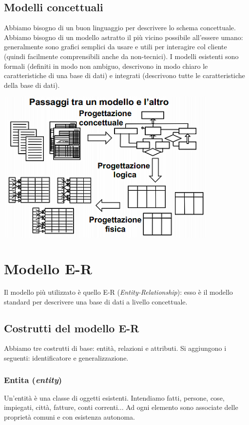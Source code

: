 \subsection{Modelli concettuali}
Abbiamo bisogno di un buon linguaggio per descrivere lo schema concettuale. Abbiamo bisogno di un modello astratto il più vicino possibile all'essere umano: generalmente sono grafici semplici da usare e utili per interagire col cliente (quindi facilmente comprensibili anche da non-tecnici). I modelli esistenti sono formali (definiti in modo non ambiguo, descrivono in modo chiaro le caratteristiche di una base di dati) e integrati (descrivono tutte le caratteristiche della base di dati).
\begin{center}\includegraphics{images/4.PNG}\end{center}
\section{Modello E-R} Il modello più utilizzato è quello E-R (\emph{Entity-Relationship}): esso è il modello standard per descrivere una base di dati a livello concettuale.
\subsection{Costrutti del modello E-R}
Abbiamo tre costrutti di base: entità, relazioni e attributi. Si aggiungono i seguenti: identificatore e generalizzazione.
\subsubsection{Entita (\emph{entity})}
Un'entità è una classe di oggetti esistenti. Intendiamo fatti, persone, cose, impiegati, città, fatture, conti correnti... Ad ogni elemento sono associate delle proprietà comuni e con esistenza autonoma.\\

